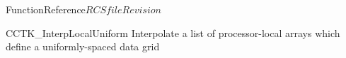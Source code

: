 \begin{cactuspart}{FunctionReference}{$RCSfile$}{$Revision$}


\begin{FunctionDescription}{CCTK\_InterpLocalUniform}
\label{CCTK-InterpLocalUniform}
Interpolate a list of processor-local arrays
which define a uniformly-spaced data grid


\end{FunctionDescription}
\end{cactuspart}
